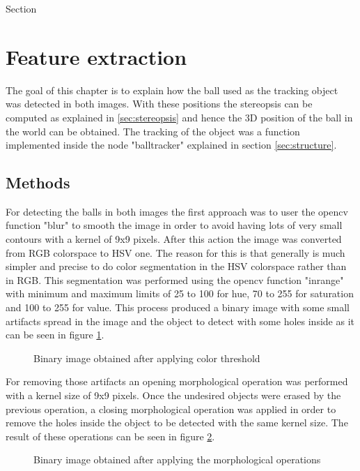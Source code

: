 Section\section{Feature extraction} %
\label{sec:feature_extraction}
The goal of this chapter is to explain how the ball used as the tracking object was detected in both images. With these positions the stereopsis can be computed as explained in \ref{sec:stereopsis} and hence the 3D position of the ball in the world can be obtained.
The tracking of the object was a function implemented inside the node "balltracker" explained in section \ref{sec:structure}.

\subsection{Methods}
For detecting the balls in both images the first approach was to user the opencv function "blur" to smooth the image in order to avoid having lots of very small contours with a kernel of 9x9 pixels. After this action the image was converted from RGB colorspace to HSV one. The reason for this is that generally is much simpler and precise to do color segmentation in the HSV colorspace rather than in RGB. This segmentation was performed using the opencv function "inrange" with minimum and maximum limits of 25 to 100 for hue, 70 to 255 for saturation and 100 to 255 for value. This process produced a binary image with some small artifacts spread in the image and the object to detect with some holes inside as it can be seen in figure \ref{fig:binary_image}.
 
\begin{figure}[h]
    \centering
    \caption{Binary image obtained after applying color threshold}
    \label{fig:binary_image}
\end{figure}

For removing those artifacts an opening morphological operation was performed with a kernel size of 9x9 pixels. Once the undesired objects were erased by the previous operation, a closing morphological operation was applied in order to remove the holes inside the object to be detected with the same kernel size. The result of these operations can be seen in figure \ref{fig:filtered_image}.

\begin{figure}[h]
    \centering
    \caption{Binary image obtained after applying the morphological operations}
    \label{fig:filtered_image}
\end{figure}

